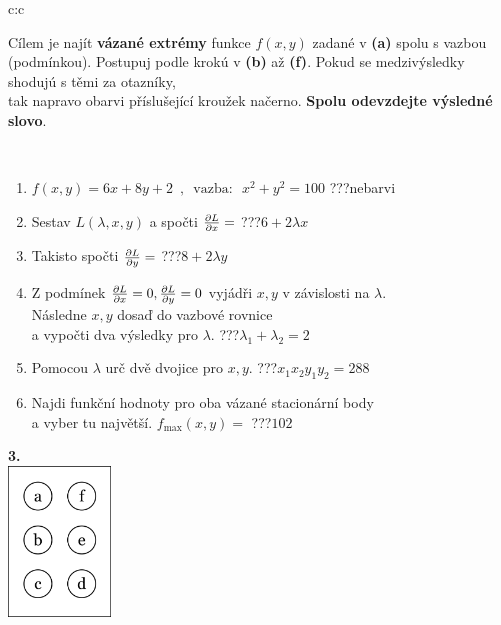 \documentclass[10pt]{report}
\begin{document}
\begin{tabular}{c:c}
\begin{minipage}[c][104.5mm][t]{0.5\linewidth}
\begin{center}
\begin{minipage}{0.95\linewidth}
\begin{center}
Cílem je najít \textbf{vázané extrémy} funkce $f(x,y)$ zadané v \textbf{(a)} spolu s vazbou (podmínkou). Postupuj podle krokú v \textbf{(b)} až \textbf{(f)}. Pokud se medzivýsledky shodujú s těmi za otazníky,\\tak napravo obarvi příslušející kroužek načerno. \textbf{Spolu odevzdejte výsledné slovo}.
\end{center}
\end{minipage}
\\[1mm]
\begin{minipage}{0.79\linewidth}
\begin{center}
\begin{varwidth}{\linewidth}
\begin{enumerate}
\normalsize
\item $f(x,y)=6x+8y+2 \enspace , \enspace \mathrm{vazba:} \enspace x^2+y^2=100$\quad \dotfill\; ???\;\dotfill \quad nebarvi
\item Sestav $L(\lambda,x,y)$ a spočti $\pdv{L}{x}=$\quad \dotfill\; ???\;\dotfill \quad $6+2\lambda x$
\item Takisto spočti $\pdv{L}{y}=$\quad \dotfill\; ???\;\dotfill \quad $8+2\lambda y$
\item Z podmínek $\pdv{L}{x}=0 , \pdv{L}{y}=0$ vyjádři $x,y$ v závislosti na $\lambda$.\\ \phantom{xxxxxx}Následne $x,y$ dosaď do vazbové rovnice\\ \phantom{xxxxxx}a vypočti dva výsledky pro $\lambda$.\quad \dotfill\; ???\;\dotfill \quad $\lambda_1+\lambda_2=2$
\item Pomocou $\lambda$ urč dvě dvojice pro $x,y$.\quad \dotfill\; ???\;\dotfill \quad $x_1 x_2 y_1 y_2=288$
\item Najdi funkční hodnoty pro oba vázané stacionární body\\ \phantom{xxxxxx}a vyber tu najvětší. $f_{\text{max}}(x,y)=$\quad \dotfill\; ???\;\dotfill \quad $102$
\end{enumerate}
\end{varwidth}
\end{center}
\end{minipage}
\begin{minipage}{0.20\linewidth}
\begin{center}
{\Huge\bfseries 3.} \\[2mm]
\includegraphics[height=40mm]{../images/braille.png}

\end{center}
\end{minipage}
\end{center}
\end{minipage}
\end{tabular}
\end{document}
